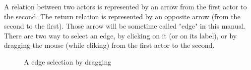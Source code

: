 
A relation between two actors is represented by an arrow from the first actor to the second. The return relation is represented by an opposite arrow (from the second to the first). Those arrow will be sometime called "edge" in this manual.\\

There are two way to select an edge, by clicking on it (or on its label), or by dragging the mouse (while cliking) from the first actor to the second.\\

\begin{figure}[h!]
\centering
{}
\caption{A edge selection by dragging}

\end{figure}

